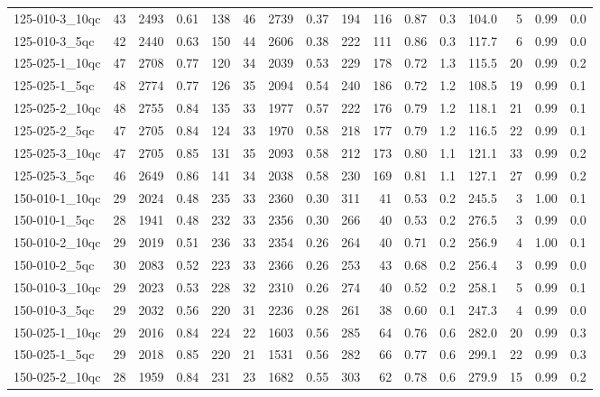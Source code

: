 \documentclass[twoside]{article}
\begin{document}
\begin{longtable}{l|rrrr|rrrr|rrr|rrrr}
		125-010-3\_10qc & 43 & 2493 & 0.61 & 138 & 46 & 2739 & 0.37 & 194 & 116 & 0.87 & 0.3 & 104.0 & 5 & 0.99 & 0.0 \\
		125-010-3\_5qc & 42 & 2440 & 0.63 & 150 & 44 & 2606 & 0.38 & 222 & 111 & 0.86 & 0.3 & 117.7 & 6 & 0.99 & 0.0 \\
		125-025-1\_10qc & 47 & 2708 & 0.77 & 120 & 34 & 2039 & 0.53 & 229 & 178 & 0.72 & 1.3 & 115.5 & 20 & 0.99 & 0.2 \\
		125-025-1\_5qc & 48 & 2774 & 0.77 & 126 & 35 & 2094 & 0.54 & 240 & 186 & 0.72 & 1.2 & 108.5 & 19 & 0.99 & 0.1 \\
		125-025-2\_10qc & 48 & 2755 & 0.84 & 135 & 33 & 1977 & 0.57 & 222 & 176 & 0.79 & 1.2 & 118.1 & 21 & 0.99 & 0.1 \\
		125-025-2\_5qc & 47 & 2705 & 0.84 & 124 & 33 & 1970 & 0.58 & 218 & 177 & 0.79 & 1.2 & 116.5 & 22 & 0.99 & 0.1 \\
		125-025-3\_10qc & 47 & 2705 & 0.85 & 131 & 35 & 2093 & 0.58 & 212 & 173 & 0.80 & 1.1 & 121.1 & 33 & 0.99 & 0.2 \\
		125-025-3\_5qc & 46 & 2649 & 0.86 & 141 & 34 & 2038 & 0.58 & 230 & 169 & 0.81 & 1.1 & 127.1 & 27 & 0.99 & 0.2 \\
		150-010-1\_10qc & 29 & 2024 & 0.48 & 235 & 33 & 2360 & 0.30 & 311 & 41 & 0.53 & 0.2 & 245.5 & 3 & 1.00 & 0.1 \\
		150-010-1\_5qc & 28 & 1941 & 0.48 & 232 & 33 & 2356 & 0.30 & 266 & 40 & 0.53 & 0.2 & 276.5 & 3 & 0.99 & 0.0 \\
		150-010-2\_10qc & 29 & 2019 & 0.51 & 236 & 33 & 2354 & 0.26 & 264 & 40 & 0.71 & 0.2 & 256.9 & 4 & 1.00 & 0.1 \\
		150-010-2\_5qc & 30 & 2083 & 0.52 & 223 & 33 & 2366 & 0.26 & 253 & 43 & 0.68 & 0.2 & 256.4 & 3 & 0.99 & 0.0 \\
		150-010-3\_10qc & 29 & 2023 & 0.53 & 228 & 32 & 2310 & 0.26 & 274 & 40 & 0.52 & 0.2 & 258.1 & 5 & 0.99 & 0.1 \\
		150-010-3\_5qc & 29 & 2032 & 0.56 & 220 & 31 & 2236 & 0.28 & 261 & 38 & 0.60 & 0.1 & 247.3 & 4 & 0.99 & 0.0 \\
		150-025-1\_10qc & 29 & 2016 & 0.84 & 224 & 22 & 1603 & 0.56 & 285 & 64 & 0.76 & 0.6 & 282.0 & 20 & 0.99 & 0.3 \\
		150-025-1\_5qc & 29 & 2018 & 0.85 & 220 & 21 & 1531 & 0.56 & 282 & 66 & 0.77 & 0.6 & 299.1 & 22 & 0.99 & 0.3 \\
		150-025-2\_10qc & 28 & 1959 & 0.84 & 231 & 23 & 1682 & 0.55 & 303 & 62 & 0.78 & 0.6 & 279.9 & 15 & 0.99 & 0.2 \\

\end{longtable}
\end{document}
